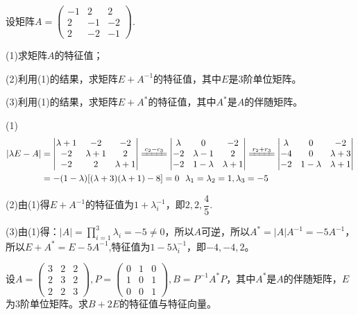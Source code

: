 \documentclass[a4paper]{report}
\begin{document}
\EX 设矩阵$
A=
\begin{pmatrix}
-1&2&2\\
2&-1&-2\\
2&-2&-1
\end{pmatrix}
$.

(1)求矩阵$A$的特征值；

(2)利用(1)的结果，求矩阵$E+A^{-1}$的特征值，其中$E$是3阶单位矩阵。

(3)利用(1)的结果，求矩阵$E+A^{*}$的特征值，其中$A^{*}$是$A$的伴随矩阵。

\begin{jie}
(1)
\begin{align*}
|\lambda E-A|&=
\begin{vmatrix}
\lambda+1&-2&-2\\
-2&\lambda+1&2\\
-2&2&\lambda+1
\end{vmatrix}
\xlongequal{c_2-c_3}
\begin{vmatrix}
\lambda&0&-2\\
-2&\lambda-1&2\\
-2&1-\lambda&\lambda+1
\end{vmatrix}\xlongequal{r_2+r_3}
\begin{vmatrix}
\lambda&0&-2\\
-4&0&\lambda+3\\
-2&1-\lambda&\lambda+1
\end{vmatrix}\\&=-(1-\lambda)[(\lambda+3)(\lambda+1)-8]=0~~\lambda_1=\lambda_2=1,\lambda_3=-5
\end{align*}

(2)由(1)得$E+A^{-1}$的特征值为$1+\lambda_{i}^{-1}$，即$2,2,\dfrac{4}{5}$.

(3)由(1)得：$|A|=\prod\limits_{i=1}^{3}\lambda_i=-5\neq0$，所以$A$可逆，所以$A^*=|A|A^{-1}=-5A^{-1}$，所以$E+A^*=E-5A^{-1}$,特征值为$1-5\lambda_{i}^{-1}$，即$-4,-4,2$。
\end{jie}

\EX 设$
A=
\begin{pmatrix}
3&2&2\\
2&3&2\\
2&2&3
\end{pmatrix},P=
\begin{pmatrix}
0&1&0\\
1&0&1\\
0&0&1
\end{pmatrix}
,B=P^{-1}A^{*}P$，其中$A^{*}$是$A$的伴随矩阵，$E$为3阶单位矩阵。求$B+2E$的特征值与特征向量。
\end{document}
